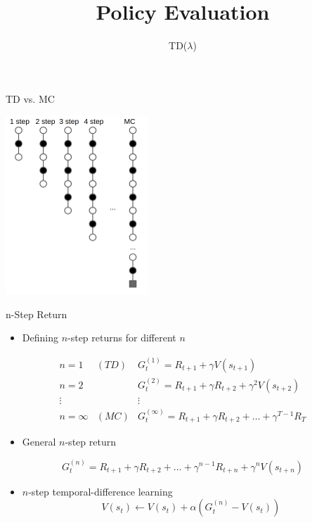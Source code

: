 \documentclass[aspectratio=169]{../latex_main/tntbeamer}  %
\title[Reinforcement Learning: Policy Evaluation]{Policy Evaluation}
\subtitle{TD($\lambda$)}
\begin{document}
	
	\maketitle


\begin{frame}[c]{TD vs. MC}

	\centering
	\vspace{-2em}
	\includegraphics[width=0.4\textwidth]{images/td_vs_mc}
	
	
\end{frame}
\begin{frame}[c]{n-Step Return}
	
\begin{itemize}
	\item Defining $n$-step returns for different $n$
\end{itemize}

\begin{eqnarray}
n=1 & (TD) & G_t^{(1)} = R_{t+1} + \gamma V(s_{t+1})\nonumber\\
n=2 &  & G_t^{(2)} = R_{t+1} + \gamma R_{t+2} + \gamma^2 V(s_{t+2})\nonumber\\
\vdots & & \vdots\nonumber\\
n = \infty & (MC) & G_t^{(\infty)} = R_{t+1} + \gamma R_{t+2} + \ldots + \gamma^{T-1} R_T\nonumber
\end{eqnarray}

\begin{itemize}
	\item General $n$-step return
\end{itemize}

$$ G_t^{(n)} =  R_{t+1} + \gamma R_{t+2} + \ldots + \gamma^{n-1} R_{t+n} + \gamma^n V(s_{t+n})$$
	
\begin{itemize}
	\item $n$-step temporal-difference learning
	$$V(s_t) \gets V(s_t) + \alpha \left(G_t^{(n)} - V(s_t)\right) $$
\end{itemize}
	
\end{frame}
\end{document}
